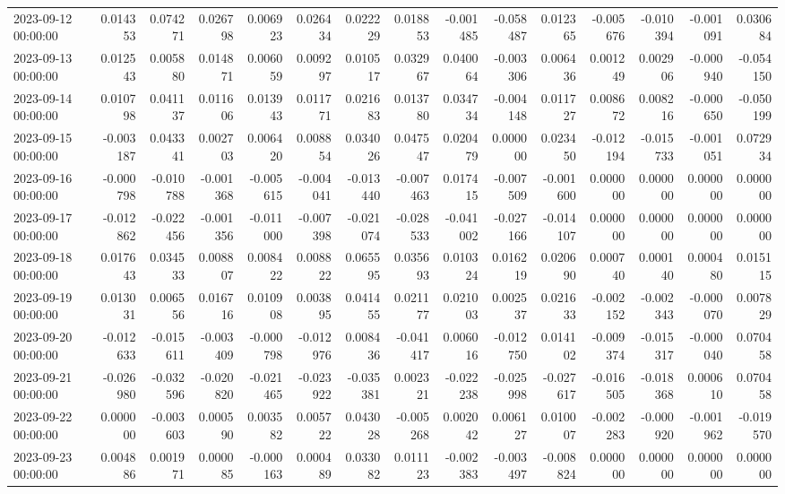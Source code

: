 \begin{tabular}{lrrrrrrrrrrrrrr}
2023-09-12 00:00:00 & 0.014353 & 0.074271 & 0.026798 & 0.006923 & 0.026434 & 0.022229 & 0.018853 & -0.001485 & -0.058487 & 0.012365 & -0.005676 & -0.010394 & -0.001091 & 0.030684 \\
2023-09-13 00:00:00 & 0.012543 & 0.005880 & 0.014871 & 0.006059 & 0.009297 & 0.010517 & 0.032967 & 0.040064 & -0.003306 & 0.006436 & 0.001249 & 0.002906 & -0.000940 & -0.054150 \\
2023-09-14 00:00:00 & 0.010798 & 0.041137 & 0.011606 & 0.013943 & 0.011771 & 0.021683 & 0.013780 & 0.034734 & -0.004148 & 0.011727 & 0.008672 & 0.008216 & -0.000650 & -0.050199 \\
2023-09-15 00:00:00 & -0.003187 & 0.043341 & 0.002703 & 0.006420 & 0.008854 & 0.034026 & 0.047547 & 0.020479 & 0.000000 & 0.023450 & -0.012194 & -0.015733 & -0.001051 & 0.072934 \\
2023-09-16 00:00:00 & -0.000798 & -0.010788 & -0.001368 & -0.005615 & -0.004041 & -0.013440 & -0.007463 & 0.017415 & -0.007509 & -0.001600 & 0.000000 & 0.000000 & 0.000000 & 0.000000 \\
2023-09-17 00:00:00 & -0.012862 & -0.022456 & -0.001356 & -0.011000 & -0.007398 & -0.021074 & -0.028533 & -0.041002 & -0.027166 & -0.014107 & 0.000000 & 0.000000 & 0.000000 & 0.000000 \\
2023-09-18 00:00:00 & 0.017643 & 0.034533 & 0.008807 & 0.008422 & 0.008822 & 0.065595 & 0.035693 & 0.010324 & 0.016219 & 0.020690 & 0.000740 & 0.000140 & 0.000480 & 0.015115 \\
2023-09-19 00:00:00 & 0.013031 & 0.006556 & 0.016716 & 0.010908 & 0.003895 & 0.041455 & 0.021177 & 0.021003 & 0.002537 & 0.021633 & -0.002152 & -0.002343 & -0.000070 & 0.007829 \\
2023-09-20 00:00:00 & -0.012633 & -0.015611 & -0.003409 & -0.000798 & -0.012976 & 0.008436 & -0.041417 & 0.006016 & -0.012750 & 0.014102 & -0.009374 & -0.015317 & -0.000040 & 0.070458 \\
2023-09-21 00:00:00 & -0.026980 & -0.032596 & -0.020820 & -0.021465 & -0.023922 & -0.035381 & 0.002321 & -0.022238 & -0.025998 & -0.027617 & -0.016505 & -0.018368 & 0.000610 & 0.070458 \\
2023-09-22 00:00:00 & 0.000000 & -0.003603 & 0.000590 & 0.003582 & 0.005722 & 0.043028 & -0.005268 & 0.002042 & 0.006127 & 0.010007 & -0.002283 & -0.000920 & -0.001962 & -0.019570 \\
2023-09-23 00:00:00 & 0.004886 & 0.001971 & 0.000085 & -0.000163 & 0.000489 & 0.033082 & 0.011123 & -0.002383 & -0.003497 & -0.008824 & 0.000000 & 0.000000 & 0.000000 & 0.000000 \\

\end{tabular}
